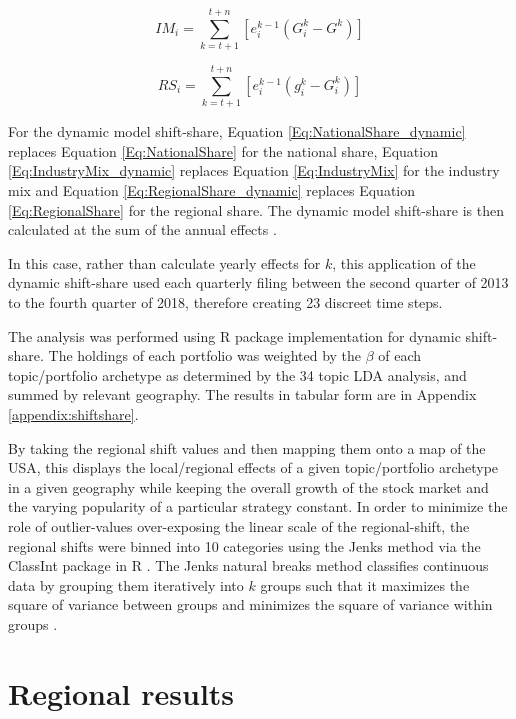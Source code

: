 \begin{equation}
    IM_{i} = \sum_{k=t+1}^{t+n}[e^{k-1}_i(G^{k}_{i}-G^{k})]
     \label{Eq:IndustryMix_dynamic}
\end{equation}

\begin{equation}
    RS_{i} = \sum_{k=t+1}^{t+n}[e^{k-1}_i(g^{k}_{i} - G^{k}_{i} )]
        \label{Eq:RegionalShare_dynamic}
\end{equation}

For the dynamic model shift-share, Equation \ref{Eq:NationalShare_dynamic} replaces Equation \ref{Eq:NationalShare} for the national share, Equation \ref{Eq:IndustryMix_dynamic} replaces Equation \ref{Eq:IndustryMix}  for the industry mix and Equation \ref{Eq:RegionalShare_dynamic} replaces Equation \ref{Eq:RegionalShare} for the regional share.  The dynamic model shift-share is then calculated at the sum of the annual effects \citep{BarffKnight88}.  

In this case, rather than calculate yearly effects for $k$, this application of the dynamic shift-share used each quarterly filing between the second quarter of 2013 to the fourth quarter of 2018, therefore creating 23 discreet time steps.

The analysis was performed using \cite{Soudis2019} R package implementation for dynamic shift-share. The holdings of each portfolio was weighted by the $\beta$ of each topic/portfolio archetype as determined by the 34 topic LDA analysis, and summed by relevant geography. The results in tabular form are in Appendix \ref{appendix:shiftshare}.

By taking the regional shift values and then mapping them onto a map of the USA, this displays the local/regional effects of a given topic/portfolio archetype in a given geography while keeping the overall growth of the stock market and the varying popularity of a particular strategy constant. In order to minimize the role of outlier-values over-exposing the linear scale of the regional-shift, the regional shifts were binned into 10 categories using the Jenks method via the ClassInt package in R \citep{classInt}.  The Jenks natural breaks method classifies continuous data by grouping them iteratively into $k$ groups such that it maximizes the square of variance between groups and minimizes the square of variance within groups \citep{jenks1967data}.  




\section{Regional results}

